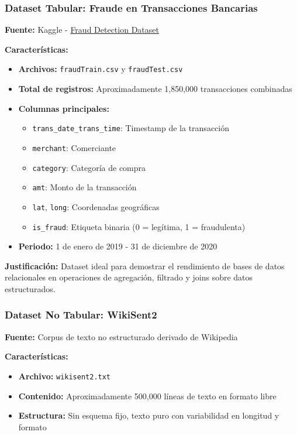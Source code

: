 \documentclass[12pt]{src/formato_utem}
\begin{document}
\subsubsection*{Dataset Tabular: Fraude en Transacciones Bancarias}

\textbf{Fuente:} Kaggle - \href{https://www.kaggle.com/datasets/kartik2112/fraud-detection}{Fraud Detection Dataset}

\textbf{Características:}
\begin{itemize}
    \item \textbf{Archivos:} \texttt{fraudTrain.csv} y \texttt{fraudTest.csv}
    \item \textbf{Total de registros:} Aproximadamente 1,850,000 transacciones combinadas
    \item \textbf{Columnas principales:} 
    \begin{itemize}
        \item \texttt{trans\_date\_trans\_time}: Timestamp de la transacción
        \item \texttt{merchant}: Comerciante
        \item \texttt{category}: Categoría de compra
        \item \texttt{amt}: Monto de la transacción
        \item \texttt{lat}, \texttt{long}: Coordenadas geográficas
        \item \texttt{is\_fraud}: Etiqueta binaria (0 = legítima, 1 = fraudulenta)
    \end{itemize}
    \item \textbf{Periodo:} 1 de enero de 2019 - 31 de diciembre de 2020
\end{itemize}

\textbf{Justificación:} Dataset ideal para demostrar el rendimiento de bases de datos relacionales en operaciones de agregación, filtrado y joins sobre datos estructurados.

\subsubsection*{Dataset No Tabular: WikiSent2}

\textbf{Fuente:} Corpus de texto no estructurado derivado de Wikipedia

\textbf{Características:}
\begin{itemize}
    \item \textbf{Archivo:} \texttt{wikisent2.txt}
    \item \textbf{Contenido:} Aproximadamente 500,000 líneas de texto en formato libre
    \item \textbf{Estructura:} Sin esquema fijo, texto puro con variabilidad en longitud y formato
\end{itemize}
\end{document}
